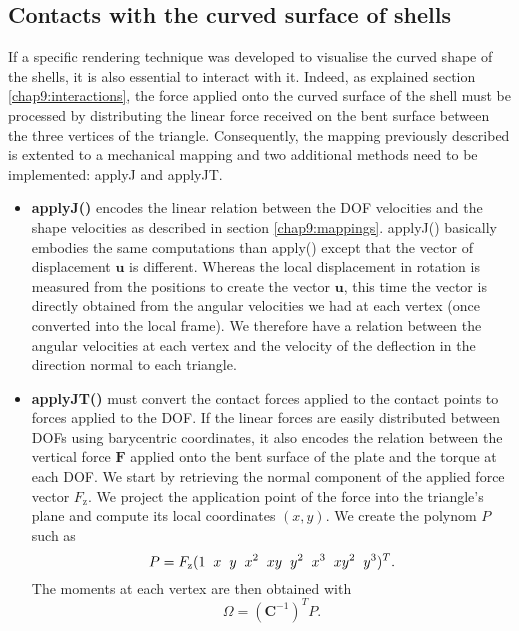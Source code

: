 	\subsection{Contacts with the curved surface of shells}
If a specific rendering technique was developed to visualise the curved shape of the shells, it is also essential to interact with it. Indeed, as explained section \ref{chap9:interactions}, the force applied onto the curved surface of the shell must be processed by distributing the linear force received on the bent surface between the three vertices of the triangle. Consequently, the mapping previously described is extented to a mechanical mapping and two additional methods need to be implemented: applyJ and applyJT. 
%
\begin{itemize}
\item \textbf{applyJ()} encodes the linear relation between the DOF velocities and the shape velocities as described in section \ref{chap9:mappings}. applyJ() basically embodies the same computations than apply() except that the vector of displacement $\mathbf{u}$ is different. Whereas the local displacement in rotation is measured from the positions to create the vector $\mathbf{u}$, this time the vector is directly obtained from the angular velocities we had at each vertex (once converted into the local frame). We therefore have a relation between the angular velocities at each vertex and the velocity of the deflection in the direction normal to each triangle. 
\item \textbf{applyJT()} must convert the contact forces applied to the contact points to forces applied to the DOF. If the linear forces are easily distributed between DOFs using barycentric coordinates, it also encodes the relation between the vertical force $ \mathbf{F} $ applied onto the bent surface of the plate and the torque at each DOF. We start by retrieving the normal component of the applied force vector $F_{\mathrm{z}}$. We project the application point of the force into the triangle's plane and compute its local coordinates $(x,y)$. We create the polynom $P$ such as 
%
\begin{equation}
P = F_{\mathrm{z}}(1 \hspace{0.2cm} x \hspace{0.2cm} y \hspace{0.2cm} x^2 \hspace{0.2cm} xy \hspace{0.2cm} y^2 \hspace{0.2cm} x^3 \hspace{0.2cm} xy^2 \hspace{0.2cm} y^3)^T. 
\end{equation}
%
The moments at each vertex are then obtained with 
\begin{equation}
\Omega = (\textbf{C}^{-1})^T P.
\end{equation}
\end{itemize}



